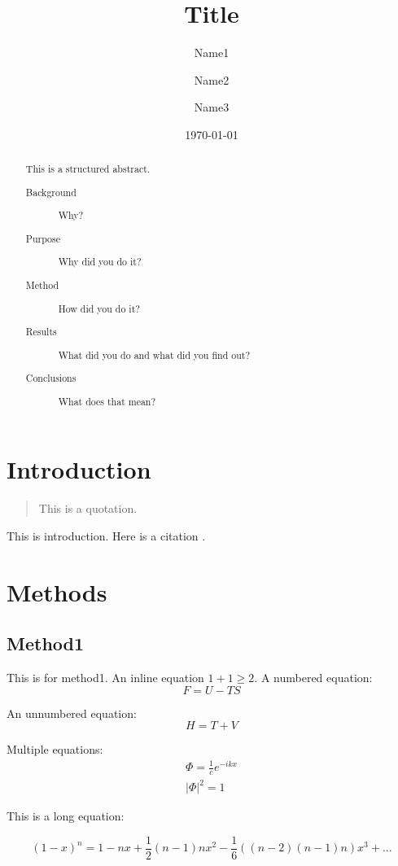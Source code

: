 \documentclass[
aps, %
prb, 
twocolumn, %
10pt, %
superscriptaddress, %
amsfont, %
amssymb, %
amsmath, %
showkeys, %
floats, %
final, 
letterpaper, %
balancelastpage, %
flushbottom, %
citeautoscript,
]{revtex4-2}
\begin{document}
\title{Title}
\author{Name1}
\author{Name2}
\author{Name3}
\date{\today}

\begin{abstract}
This is a structured abstract.
\begin{description}
\item[Background] Why?
\item[Purpose] Why did you do it?
\item[Method] How did you do it?
\item[Results] What did you do and what did you find out?
\item[Conclusions] What does that mean?
\end{description}
\end{abstract}


\maketitle

\section{Introduction}
\begin{quotation}
This is a quotation.
\end{quotation}
This is introduction. Here is a citation \cite{PhysRevB.78.104104}.

\section{Methods}
\subsection{Method1}
This is for method1. An inline equation $1+1\geq2$.
A numbered equation:
\begin{equation}
F=U-TS
\end{equation}

An unnumbered equation:
\[H=T+V\]

Multiple equations:
\begin{eqnarray}
\Phi=\frac{1}{c}e^{-ikx}\\
|\Phi|^2=1
\end{eqnarray}

This is a long equation:
\begin{widetext}
\[(1-x)^n=1-nx+\frac{1}{2}(n-1)nx^2-\frac{1}{6}((n-2)(n-1)n)x^3+...\]
\end{widetext}
\end{document}
